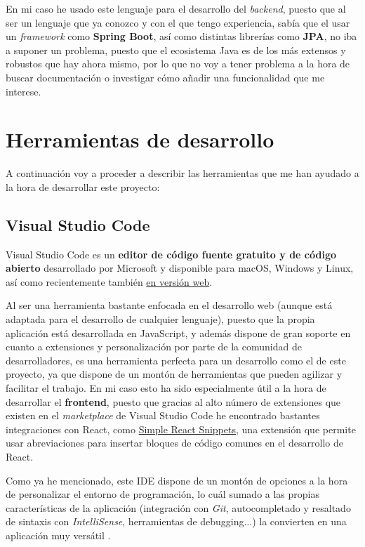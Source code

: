  En mi caso he usado este lenguaje para el desarrollo del \textit{backend}, puesto que al ser un lenguaje que ya conozco y con el que tengo experiencia, sabía 	que el usar un \textit{framework} como \textbf{Spring Boot}, así como distintas librerías como \textbf{JPA}, no iba a suponer un problema, puesto que el ecosistema Java es de los más extensos y robustos que hay ahora mismo, por lo que no voy a tener problema a la hora de buscar documentación o investigar cómo añadir una funcionalidad que me interese.

\section{Herramientas de desarrollo}

A continuación voy a proceder a describir las herramientas que me han ayudado a la hora de desarrollar este proyecto:

\subsection{Visual Studio Code}

Visual Studio Code es un \textbf{editor de código fuente gratuito y de código abierto} desarrollado por Microsoft y disponible para macOS, Windows y Linux, así como recientemente también \href{https://vscode.dev}{en versión web}.

Al ser una herramienta bastante enfocada en el desarrollo web (aunque está adaptada para el desarrollo de cualquier lenguaje), puesto que la propia aplicación está desarrollada en JavaScript, y además dispone de gran soporte en cuanto a extensiones y personalización por parte de la comunidad de desarrolladores, es una herramienta perfecta para un desarrollo como el de este proyecto, ya que dispone de un montón de herramientas que pueden agilizar y facilitar el trabajo. En mi caso esto ha sido especialmente útil a la hora de desarrollar el \textbf{frontend}, puesto que gracias al alto número de extensiones que existen en el \textit{marketplace} de Visual Studio Code he encontrado bastantes integraciones con React, como \href{https://marketplace.visualstudio.com/items?itemName=burkeholland.simple-react-snippets}{Simple React Snippets}, una extensión que permite usar abreviaciones para insertar bloques de código comunes en el desarrollo de React.

Como ya he mencionado, este IDE dispone de un montón de opciones a la hora de personalizar el entorno de programación, lo cuál sumado a las propias características de la aplicación (integración con \textit{Git}, autocompletado y resaltado de sintaxis con \textit{IntelliSense}, herramientas de debugging...) la convierten en una aplicación muy versátil \cite{vscode:main}.

